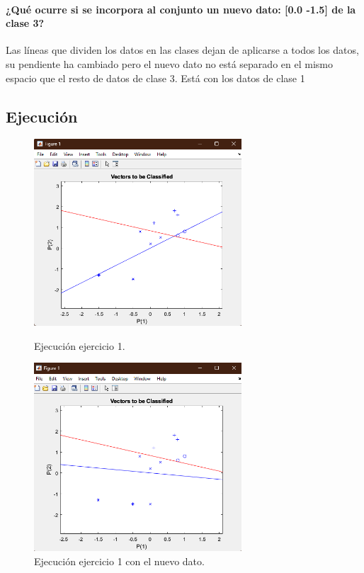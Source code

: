 \documentclass[a4paper, 12pt]{article}
\begin{document}
        \paragraph{¿Qué ocurre si se incorpora al conjunto un nuevo dato: [0.0 -1.5] de la clase 3?}
        Las líneas que dividen los datos en las clases dejan de aplicarse a todos los datos, su pendiente ha cambiado pero el nuevo dato no está separado en el mismo espacio que el resto de datos de clase 3. Está con los datos de clase 1

        \newpage
	\subsection{Ejecución}
    	\begin{figure}[htp!]
    		\centering
    		\includegraphics[width=0.69\textwidth]{figures/parte1/Ej1/Ej1_fig1.png}
    		\caption{Ejecución ejercicio 1.}
                \includegraphics[width=0.69\textwidth]{figures/parte1/Ej1/Ej1_fig2.png}
        		\caption{Ejecución ejercicio 1 con el nuevo dato.}
    	\end{figure}
        \newpage
\end{document}
